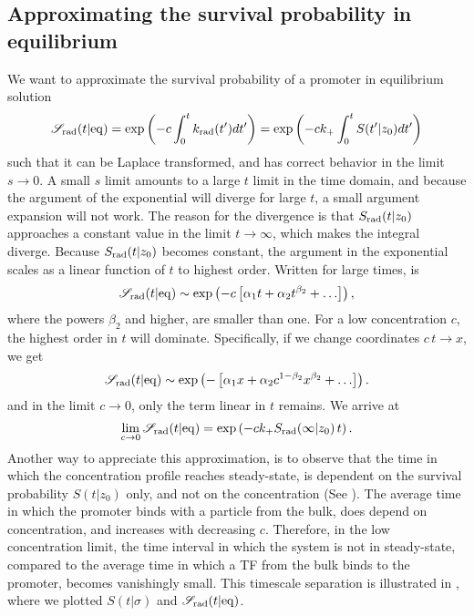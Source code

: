 \subsection{ Approximating the survival probability in equilibrium}
We want to approximate the survival probability of a promoter in equilibrium solution
\begin{equation}
 \mathscr{S}_{\rm rad}(t|{\rm eq}) = {\rm exp}\left(-c \int_0^t k_{{\rm rad}}(t') dt'\right) = {\rm exp}\left(-c k_+ \int_0^t S(t'|z_0) dt'\right)
 \elabel{Seq_app}
\end{equation}
such that it can be Laplace transformed, and has correct behavior in the limit $s\to0$. A small $s$ limit amounts to a large $t$ limit in the time domain, and because the argument of the exponential will diverge for large $t$, a small argument expansion will not work. The reason for the divergence is that $S_{\rm rad}(t|z_0)$ approaches a constant value in the limit $t\to\infty$, which makes the integral diverge. Because $S_{\rm rad}(t|z_0)$ becomes constant, the argument in the exponential scales as a linear function of $t$ to highest order. Written for large times,  is
\begin{equation}
 \mathscr{S}_{\rm rad}(t|{\rm eq}) \sim {\rm exp}\left(-c \left[ \alpha_1 t + \alpha_2 t^{\beta_2} + \ldots \right] \right),
\end{equation}
where the powers $\beta_2$ and higher, are smaller than one. For a low concentration $c$, the highest order in $t$ will dominate. Specifically, if we change coordinates $c\,t\to x$, we get
\begin{equation}
 \mathscr{S}_{\rm rad}(t|{\rm eq}) \sim {\rm exp}\left(-\left[ \alpha_1 x + \alpha_2 c^{1-\beta_2} x^{\beta_2} + \ldots \right] \right).
\end{equation}
and in the limit $c\to0$, only the term linear in $t$ remains. We arrive at
\begin{equation}
 \lim_{c\to0} \mathscr{S}_{\rm rad}(t|{\rm eq}) = {\rm exp}\left(-c k_+ S_{\rm rad}(\infty|z_0) \, t \right).
 \elabel{Seq_app2}
\end{equation}
Another way to appreciate this approximation, is to observe that the time in which the concentration profile reaches steady-state, is dependent on the survival probability $S(t|z_0)$ only, and not on the concentration (See ). The average time in which the promoter binds with a particle from the bulk, does depend on concentration, and increases with decreasing $c$. Therefore, in the low concentration limit, the time interval in which the system is not in steady-state, compared to the average time in which a TF from the bulk binds to the promoter, becomes vanishingly small. This timescale separation is illustrated in , where we plotted $S(t|\sigma)$ and $\mathscr{S}_{\rm rad}(t|{\rm eq})$.

